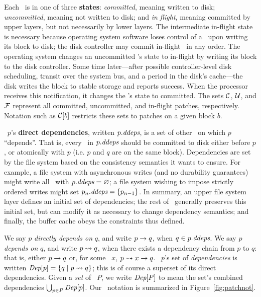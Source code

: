 Each \patch\ is in one of three \textbf{states}:
 \emph{committed}, meaning written to disk;
 \emph{uncommitted}, meaning not written to disk;
 and \emph{in flight}, meaning committed by upper layers, but not
 necessarily by lower layers.
%
The intermediate in-flight state is necessary because
 operating system software loses control of a \patch\ upon writing its block
 to disk; the disk controller may commit in-flight \patches\ in any order.
%
The operating system changes an uncommitted \patch's state to in-flight
 by writing its block to the disk controller.  Some
 time later---after possible controller-level disk scheduling, transit over
 the system bus, and a period in the disk's cache---the disk writes the block
 to stable storage and reports success.  When the processor receives this
 notification, it changes the \patch's state to committed.
%
The sets $\PDisk$, $\PMem$, and $\PInf$ represent all committed,
 uncommitted, and in-flight patches, respectively.
%
%
Notation such as $\PDisk[b]$ restricts these sets to patches
 on a given block $b$.

\Patch\ $p$'s \textbf{direct dependencies}, written $\PDDepset{p}$, is a set of
 other \patches\ on which $p$ ``depends''.
%
That is, every \patch\ in $\PDDepset{p}$ should be committed to disk either
 before $p$, or atomically with $p$ (i.e. $p$ and $q$ are on the same block).
%
Dependencies are set by the file system based on the consistency
 semantics it wants to ensure.
%
For example, a file system with asynchronous writes (and no durability
 guarantees) might write all \patches\ with $\PDDepset{p} = \emptyset$;
%
a file system wishing to impose strictly ordered writes might set
 $\PDDepset{p_n} = \{p_{n-1}\}$.
%
In summary, an upper file system layer defines an initial set of
 dependencies;
%
the rest of \Kudos\ generally preserves this initial set, but can modify
 it as necessary to change dependency semantics;
%
and finally, the buffer cache obeys the constraints thus defined.


We say $p$ \emph{directly depends on} $q$, and write $p \rightarrow q$, when
 $q \in \PDDepset{p}$.
%
We say $p$ \emph{depends on} $q$, and write $p \leadsto q$, when there
 exists a dependency chain from $p$ to $q$: that is, either $p \rightarrow q$
 or, for some \patch\ $x$, $p \leadsto x \rightarrow q$.
%
\Patch\ $p$'s set of \emph{dependencies} is written $\textit{Dep}[p] = \{ q \mid
 p \leadsto q \}$; this is of course a superset of its direct dependencies.
%
Given a \emph{set} of \patches\ $P$, we write $\textit{Dep}[P]$ to mean the set's
 combined dependencies $\bigcup_{p\in P} \textit{Dep}[p]$. Our \patch\ notation
 is summarized in Figure~\ref{fig:patchnot}.


